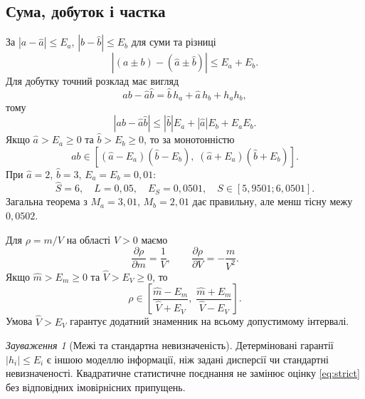 \documentclass[11pt,a4paper]{article}
\theoremstyle{remark}
\newtheorem{remark}[definition]{Зауваження}
\begin{document}
\subsection*{Сума, добуток і частка}
За $|a-\widehat a|\le E_a$, $|b-\widehat b|\le E_b$ для суми та різниці
\[
 |(a\pm b)-(\widehat a\pm\widehat b)|\le E_a+E_b.
\]
Для добутку точний розклад має вигляд
\[
 ab-\widehat a\widehat b=\widehat b\,h_a+\widehat a\,h_b+h_ah_b,
\]
тому
\begin{equation}\label{eq:product}
 |ab-\widehat a\widehat b|\le|\widehat b|E_a+|\widehat a|E_b+E_aE_b.
\end{equation}
Якщо $\widehat a>E_a\ge0$ та $\widehat b>E_b\ge0$, то за монотонністю
\begin{equation}
 ab\in[(\widehat a-E_a)(\widehat b-E_b),\;(\widehat a+E_a)(\widehat b+E_b)].
\end{equation}
При $\widehat a=2$, $\widehat b=3$, $E_a=E_b=0{,}01$:
\[
 \widehat S=6,\quad L=0{,}05,\quad E_S=0{,}0501,\quad S\in[5{,}9501;6{,}0501].
\]
Загальна теорема з $M_a=3{,}01$, $M_b=2{,}01$ дає правильну, але менш тісну межу $0{,}0502$.

Для $\rho=m/V$ на області $V>0$ маємо
\[
 \frac{\partial\rho}{\partial m}=\frac1V,\qquad
 \frac{\partial\rho}{\partial V}=-\frac{m}{V^2}.
\]
Якщо $\widehat m>E_m\ge0$ та $\widehat V>E_V\ge0$, то
\begin{equation}
 \rho\in\left[\frac{\widehat m-E_m}{\widehat V+E_V},\;
 \frac{\widehat m+E_m}{\widehat V-E_V}\right].
\end{equation}
Умова $\widehat V>E_V$ гарантує додатний знаменник на всьому допустимому інтервалі.

\begin{remark}[Межі та стандартна невизначеність]
Детерміновані гарантії $|h_i|\le E_i$ є іншою моделлю інформації, ніж задані дисперсії чи стандартні невизначеності. Квадратичне статистичне поєднання не замінює оцінку \eqref{eq:strict} без відповідних імовірнісних припущень.
\end{remark}
\end{document}
